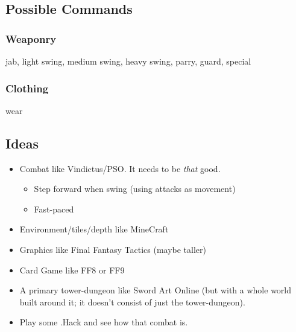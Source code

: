 \documentclass{article}
\begin{document}
\subsection*{Possible Commands} \subsubsection*{Weaponry} jab, light
swing, medium swing, heavy swing, parry, guard, special

\subsubsection*{Clothing} wear

\bigskip
\bigskip
\hline 

\subsection*{Ideas}
\begin{itemize}
    \item Combat like Vindictus/PSO. It needs to be \textit{that} good.
        \begin{itemize}
            \item Step forward when swing (using attacks as movement)
            \item Fast-paced
        \end{itemize}
    \item Environment/tiles/depth like MineCraft
    \item Graphics like Final Fantasy Tactics (maybe taller)
    \item Card Game like FF8 or FF9
    \item A primary tower-dungeon like Sword Art Online (but with a 
        whole world built around it; it doesn't consist of just the
        tower-dungeon).
    \item Play some .Hack and see how that combat is.

\end{itemize}
\end{document}
